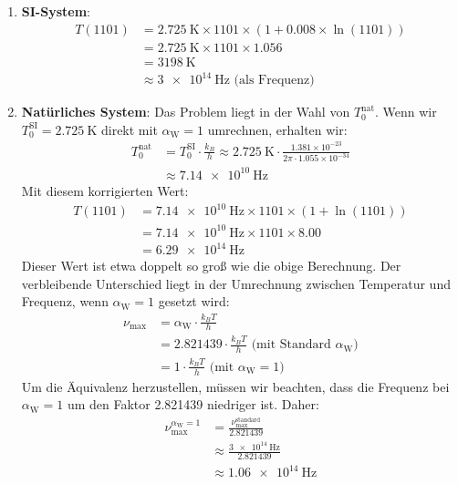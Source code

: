 \documentclass[12pt,a4paper]{article}
\newcommand{\alphaW}{\alpha_{\text{W}}}
\begin{document}
	\begin{enumerate}
		\item \textbf{SI-System}:
		\begin{align}
			T(1101) &= \SI{2.725}{\kelvin} \times 1101 \times (1 + 0.008 \times \ln(1101)) \\
			&= \SI{2.725}{\kelvin} \times 1101 \times 1.056 \\
			&= \SI{3198}{\kelvin} \\
			&\approx \SI{3e14}{\hertz} \text{ (als Frequenz)}
		\end{align}
		\item \textbf{Natürliches System}:
		Das Problem liegt in der Wahl von \(T_0^{\text{nat}}\). Wenn wir \(T_0^{\text{SI}} = \SI{2.725}{\kelvin}\) direkt mit \(\alphaW = 1\) umrechnen, erhalten wir:
		\begin{align}
			T_0^{\text{nat}} &= T_0^{\text{SI}} \cdot \frac{k_B}{h} \approx \SI{2.725}{\kelvin} \cdot \frac{1.381 \times 10^{-23}}{2\pi \cdot 1.055 \times 10^{-34}} \\
			&\approx \SI{7.14e10}{\hertz}
		\end{align}
		Mit diesem korrigierten Wert:
		\begin{align}
			T(1101) &= \SI{7.14e10}{\hertz} \times 1101 \times (1 + \ln(1101)) \\
			&= \SI{7.14e10}{\hertz} \times 1101 \times 8.00 \\
			&= \SI{6.29e14}{\hertz}
		\end{align}
		Dieser Wert ist etwa doppelt so groß wie die obige Berechnung. Der verbleibende Unterschied liegt in der Umrechnung zwischen Temperatur und Frequenz, wenn \(\alphaW = 1\) gesetzt wird:
		\begin{align}
			\nu_{\text{max}} &= \alphaW \cdot \frac{k_B T}{h} \\
			&= 2.821439 \cdot \frac{k_B T}{h} \text{ (mit Standard \(\alphaW\))} \\
			&= 1 \cdot \frac{k_B T}{h} \text{ (mit \(\alphaW = 1\))}
		\end{align}
		Um die Äquivalenz herzustellen, müssen wir beachten, dass die Frequenz bei \(\alphaW = 1\) um den Faktor 2.821439 niedriger ist. Daher:
		\begin{align}
			\nu_{\text{max}}^{\alphaW = 1} &= \frac{\nu_{\text{max}}^{\text{standard}}}{2.821439} \\
			&\approx \frac{\SI{3e14}{\hertz}}{2.821439} \\
			&\approx \SI{1.06e14}{\hertz}
		\end{align}

\end{enumerate}
\end{document}
